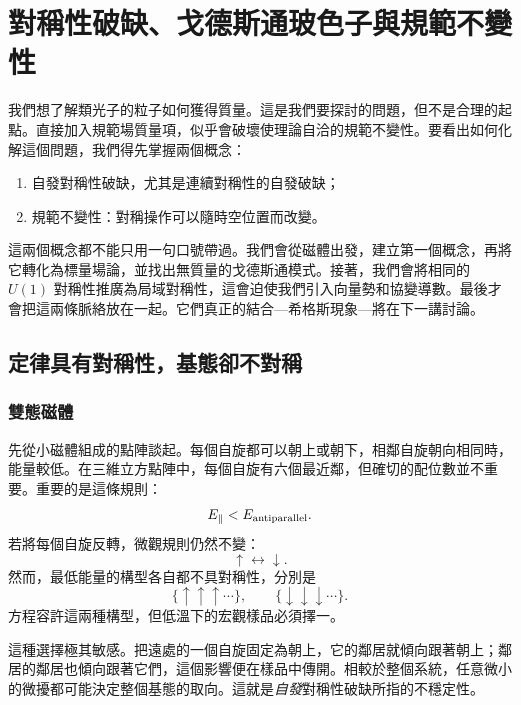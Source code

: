 \chapter{對稱性破缺、戈德斯通玻色子與規範不變性}

我們想了解類光子的粒子如何獲得質量。這是我們要探討的問題，但不是合理的起點。直接加入規範場質量項，似乎會破壞使理論自洽的規範不變性。要看出如何化解這個問題，我們得先掌握兩個概念：
\begin{enumerate}
  \item 自發對稱性破缺，尤其是連續對稱性的自發破缺；
  \item 規範不變性：對稱操作可以隨時空位置而改變。
\end{enumerate}
這兩個概念都不能只用一句口號帶過。我們會從磁體出發，建立第一個概念，再將它轉化為標量場論，並找出無質量的戈德斯通模式。接著，我們會將相同的 \(U(1)\) 對稱性推廣為局域對稱性，這會迫使我們引入向量勢和協變導數。最後才會把這兩條脈絡放在一起。它們真正的結合---希格斯現象---將在下一講討論。

\section{定律具有對稱性，基態卻不對稱}

\subsection{雙態磁體}

先從小磁體組成的點陣談起。每個自旋都可以朝上或朝下，相鄰自旋朝向相同時，能量較低。在三維立方點陣中，每個自旋有六個最近鄰，但確切的配位數並不重要。重要的是這條規則：
\begin{equation}
  E_{\parallel}<E_{\rm antiparallel}.
\end{equation}
若將每個自旋反轉，微觀規則仍然不變：
\begin{equation}
  \uparrow\longleftrightarrow\downarrow.
\end{equation}
然而，最低能量的構型各自都不具對稱性，分別是
\begin{equation}
  \{\uparrow\uparrow\uparrow\cdots\},
  \qquad
  \{\downarrow\downarrow\downarrow\cdots\}.
\end{equation}
方程容許這兩種構型，但低溫下的宏觀樣品必須擇一。

這種選擇極其敏感。把遠處的一個自旋固定為朝上，它的鄰居就傾向跟著朝上；鄰居的鄰居也傾向跟著它們，這個影響便在樣品中傳開。相較於整個系統，任意微小的微擾都可能決定整個基態的取向。這就是\emph{自發}對稱性破缺所指的不穩定性。

